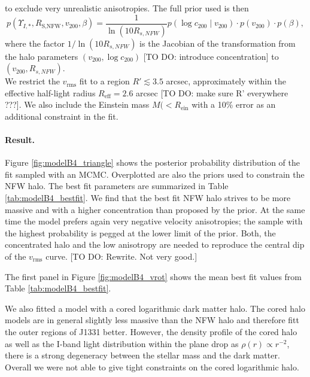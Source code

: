 to exclude very unrealistic anisotropies. The full prior used is then
\begin{equation*}
p(\Upsilon_{I,*},R_\text{S,NFW},v_{200},\beta) = \frac{1}{\ln\left( 10 R_{s,NFW}\right)} p(\log c_{200} \mid v_{200}) \cdot p(v_{200}) \cdot p(\beta), 
\end{equation*}
where the factor $1/\ln\left( 10 R_{s,NFW}\right)$ is the Jacobian of the transformation from the halo parameters $(v_{200},\log c_{200})$ [TO DO: introduce concentration] to $(v_{200},R_{s,NFW})$.
\\We restrict the $v_\text{rms}$ fit to a region $R' \lesssim 3.5$ arcsec, approximately within the effective half-light radius $R_\text{eff} = 2.6$ arcsec  [TO DO: make sure R' everywhere ???]. We also include the Einstein mass $M(<R_\text{ein}$ with a 10\% error as an additional constraint in the fit. 


\paragraph{Result.} Figure \ref{fig:modelB4_triangle} shows the posterior probability distribution of the fit sampled with an MCMC. Overplotted are also the priors used to constrain the NFW halo. The best fit parameters are summarized in Table \ref{tab:modelB4_bestfit}. We find that the best fit NFW halo strives to be more massive and with a higher concentration than  proposed by the prior. At the same time the model prefers again very negative velocity anisotropies; the sample with the highest probability is pegged at the lower limit of the prior. Both, the concentrated halo and the low anisotropy are needed to reproduce the central dip of the $v_\text{rms}$ curve. [TO DO: Rewrite. Not very good.]

The first panel in Figure \ref{fig:modelB4_vrot} shows the mean best fit values from Table \ref{tab:modelB4_bestfit}.

We also fitted a model with a cored logarithmic dark matter halo. The cored halo models are in general slightly less massive than the NFW halo and therefore fitt the outer regions of J1331 better. However, the density profile of the cored halo as well as the I-band light distribution within the plane drop as $\rho(r) \propto r^{-2}$, there is a strong degeneracy between the stellar mass and the dark matter. Overall we were not able to give tight constraints on the cored logarithmic halo.

